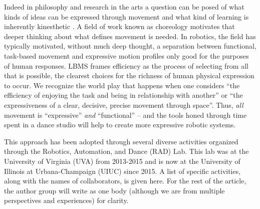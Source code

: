 \documentclass[arts,article,submit,moreauthors,pdftex,10pt,a4paper]{mdpi}
\begin{document}
Indeed in philosophy and research in the arts a question can be posed of what kinds of ideas can be expressed through movement \cite{exempli} and what kind of learning is inherently kinesthetic \cite{abrahamson2004embodied,goldman2010increasing,lindgren2013emboldened}.  A field of work known as choreology \cite{sutil2015motion} motivates that deeper thinking about what defines movement is needed.
In robotics, the field has typically motivated, without much deep thought, a separation between functional, task-based movement and expressive motion profiles only good for the purposes of human responses.
LBMS frames efficiency as the process of selecting from all that is possible, the clearest choices for the richness of human physical expression to occur. We recognize the world play that happens when one considers ``the efficiency of enjoying the task and being in relationship with another'' or ``the expressiveness of a clear, decisive, precise movement through space''. Thus, \textit{all} movement is ``expressive'' \textit{and} ``functional'' -- and the tools honed through time spent in a dance studio will help to create more expressive robotic systems.

This approach has been adopted through several diverse activities organized through the Robotics, Automation, and Dance (RAD) Lab.  This lab was at the University of Virginia (UVA) from 2013-2015 and is now at the University of Illinois at Urbana-Champaign (UIUC) since 2015.  A list of specific activities, along with the names of collaborators, is given here.  For the rest of the article, the author group will write as one body (although we are from multiple perspectives and experiences) for clarity.  
\end{document}
